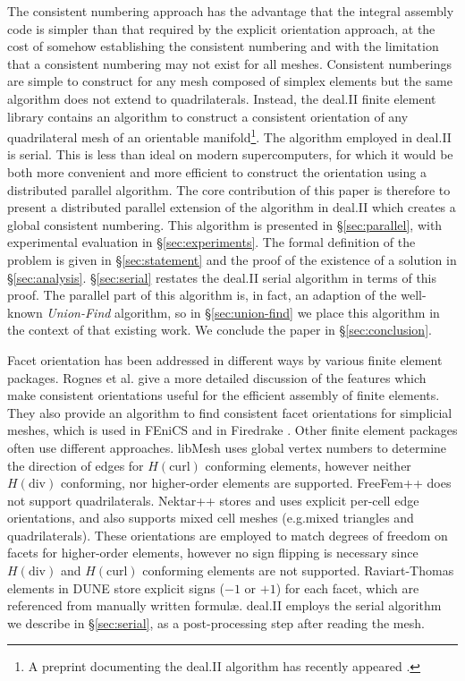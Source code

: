 \documentclass[oneeqnum,onethmnum,onefignum,onetabnum]{siamltex1213}
\newcommand{\Hdiv}{$ H( \mathrm{div} ) $}
\newcommand{\Hcurl}{$ H( \mathrm{curl} ) $}
\begin{document}
The consistent numbering approach has the advantage that the integral
assembly code is simpler than that required by the explicit orientation
approach, at the cost of somehow establishing the consistent numbering and
with the limitation that a consistent numbering may not exist for all
meshes. Consistent numberings are simple to construct for any mesh composed
of simplex elements \cite{Rognes2012} but the same algorithm does not extend
to quadrilaterals.  Instead, the deal.II finite element library
\cite{Bangerth2007} contains an algorithm to construct a consistent
orientation of any quadrilateral mesh of an orientable
manifold\footnote{A preprint documenting the deal.II algorithm has
recently appeared \cite{agelek2015}.}.  The
algorithm employed in deal.II is serial. This is less than ideal on modern
supercomputers, for which it would be both more convenient and more
efficient to construct the orientation using a distributed parallel
algorithm. The core contribution of this paper is therefore to present a
distributed parallel extension of the algorithm in deal.II which creates a
global consistent numbering.  This algorithm is presented in
\S\ref{sec:parallel}, with experimental evaluation in \S\ref{sec:experiments}.
The formal definition of the problem is given in \S\ref{sec:statement}
and the proof of the existence of a solution in \S\ref{sec:analysis}.
\S\ref{sec:serial} restates the deal.II serial algorithm in terms of
this proof.  The parallel part of this
algorithm is, in fact, an adaption of the well-known \emph{Union-Find}
algorithm, so in \S\ref{sec:union-find} we place this algorithm in the context
of that existing work.  We conclude the paper in \S\ref{sec:conclusion}.

Facet orientation has been addressed in different ways by various finite
element packages. Rognes et al.\@ \cite{Rognes2012} give a more detailed
discussion of the features which make consistent orientations useful for
the efficient assembly of finite elements. They also provide an algorithm to
find consistent facet orientations for simplicial meshes, which is used in
FEniCS \cite{Hoffman2006} and in Firedrake \cite{Rathgeber2015}.  Other
finite element packages often use different approaches.  libMesh
\cite{Kirk2006} uses global vertex numbers to determine the direction of
edges for \Hcurl{} conforming elements, however neither \Hdiv{} conforming,
nor higher-order elements are supported.  FreeFem++ \cite{Hecht2012} does
not support quadrilaterals.  Nektar++ \cite{Cantwell2015} stores and uses
explicit per-cell edge orientations, and also supports mixed cell meshes
(e.g.\@ mixed triangles and quadrilaterals).  These orientations are
employed to match degrees of freedom on facets for higher-order elements,
however no sign flipping is necessary since \Hdiv{} and \Hcurl{} conforming
elements are not supported.  Raviart-Thomas elements in DUNE
\cite{Bastian2006} store explicit signs ($-1$ or $+1$) for each facet, which
are referenced from manually written formul\ae.  deal.II \cite{Bangerth2007}
employs the serial algorithm we describe in \S\ref{sec:serial}, as a
post-processing step after reading the mesh.
\end{document}
